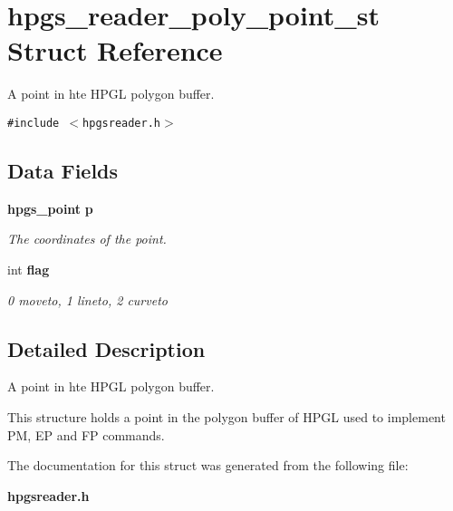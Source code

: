 \section{hpgs\_\-reader\_\-poly\_\-point\_\-st Struct Reference}
\label{structhpgs__reader__poly__point__st}
A point in hte HPGL polygon buffer.  


{\tt \#include $<$hpgsreader.h$>$}

\subsection*{Data Fields}
\begin{CompactItemize}
\item 
{\bf hpgs\_\-point} {\bf p}\label{structhpgs__reader__poly__point__st_43e696e9d5d92fa2008401d433a89345}

\begin{CompactList}\small\item\em The coordinates of the point. \item\end{CompactList}\item 
int {\bf flag}\label{structhpgs__reader__poly__point__st_f1d9dc9590231f824b5b424dccbf89c1}

\begin{CompactList}\small\item\em 0 moveto, 1 lineto, 2 curveto \item\end{CompactList}\end{CompactItemize}


\subsection{Detailed Description}
A point in hte HPGL polygon buffer. 

This structure holds a point in the polygon buffer of HPGL used to implement PM, EP and FP commands. 

The documentation for this struct was generated from the following file:\begin{CompactItemize}
\item 
{\bf hpgsreader.h}\end{CompactItemize}
